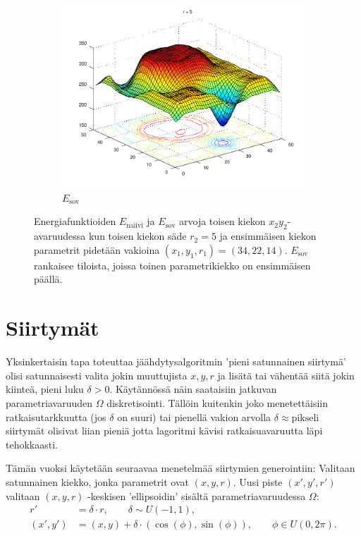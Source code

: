 \begin{figure}[p]
    \begin{subfigure}[b]{0.7\textwidth}
            \includegraphics[width=\textwidth]{figures/localmins4.pdf}
        \caption{$E_\text{sov}$
            \label{fig:localmins4}
        }
    \end{subfigure}
    \caption{Energiafunktioiden $E_\text{naiivi}$ ja $E_\text{sov}$ arvoja toisen kiekon $x_2 y_2$-avaruudessa kun toisen kiekon säde $r_2=5$ ja ensimmäisen kiekon parametrit pidetään vakioina $(x_1, y_1, r_1) = (34, 22, 14)$.
        $E_\text{sov}$ rankaisee tiloista, joissa toinen parametrikiekko on ensimmäisen päällä.
        \label{fig:localmins}}
\end{figure}


\section{Siirtymät}
\label{sec:siirtymat}

Yksinkertaisin tapa toteuttaa jäähdytysalgoritmin 'pieni satunnainen siirtymä' olisi satunnaisesti valita jokin muuttujista $x, y, r$ ja lisätä tai vähentää siitä jokin kiinteä, pieni luku $\delta > 0$.
Käytännössä näin saataisiin jatkuvan parametriavaruuden $\Omega$ diskretisointi.
Tällöin kuitenkin joko menetettäisiin ratkaisutarkkuutta (jos $\delta$ on suuri) tai pienellä vakion arvolla $\delta \approx \text{pikseli}$ siirtymät olisivat liian pieniä jotta lagoritmi kävisi ratkaisuavaruutta läpi tehokkaasti.

Tämän vuoksi käytetään seuraavaa menetelmää siirtymien generointiin:
Valitaan satunnainen kiekko, jonka parametrit ovat $(x, y, r)$.
Uusi piste $(x',y',r')$ valitaan $(x, y, r)$ -keskisen 'ellipsoidin' sisältä parametriavaruudessa $\Omega$:
\begin{align}
    r' &= \delta \cdot r, \qquad \delta \sim U(-1, 1),\\
    (x', y') &= (x, y) + \delta \cdot (\cos(\phi), \sin(\phi)), \qquad \phi \in U(0, 2\pi).
\end{align}

